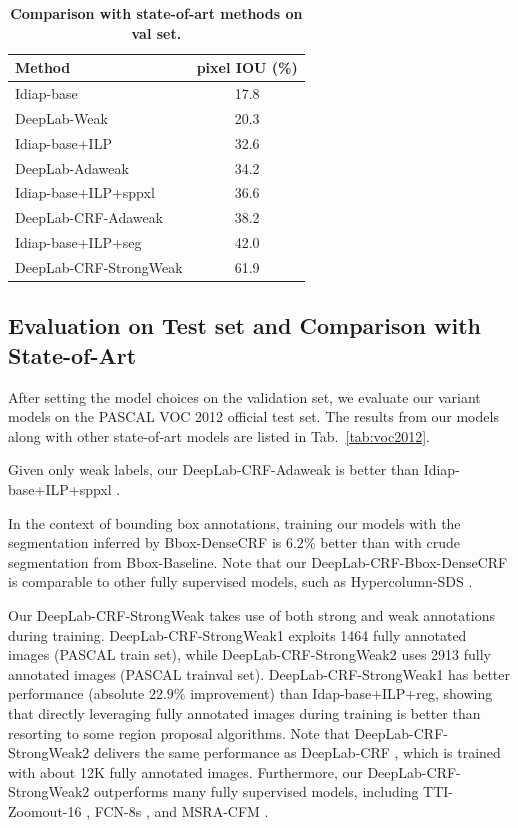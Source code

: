 \begin{table}
  \centering
  \caption{{\bf Comparison with state-of-art methods on val set.}}
  \begin{tabular}{l|c}
    {\bf Method} & pixel IOU (\%) \\
    \hline \hline
    Idiap-base   & 17.8 \\
    DeepLab-Weak & 20.3 \\
    \hline \hline
    Idiap-base+ILP  & 32.6 \\
    DeepLab-Adaweak & 34.2 \\
    \hline \hline
    Idiap-base+ILP+sppxl & 36.6 \\
    DeepLab-CRF-Adaweak  & 38.2 \\
    \hline \hline
    Idiap-base+ILP+seg       & 42.0 \\
    DeepLab-CRF-StrongWeak   & 61.9 \\
  \end{tabular}
  \label{tab:weak_state_of_art_val}
\end{table}

\subsection{Evaluation on Test set and Comparison with State-of-Art}

After setting the model choices on the validation set, we evaluate our
variant models on the PASCAL VOC 2012 official test set. The results
from our models along with other state-of-art models are listed in
Tab.~\ref{tab:voc2012}. 

Given only weak labels, our DeepLab-CRF-Adaweak is better than Idiap-base+ILP+sppxl \citep{pinheiro2014weakly}. 

In the context of bounding box annotations, training our models with the segmentation inferred by Bbox-DenseCRF is $6.2\%$ better than with crude segmentation from Bbox-Baseline. Note that our DeepLab-CRF-Bbox-DenseCRF is comparable to other fully supervised models, such as Hypercolumn-SDS \citep{hariharan2014hypercolumns}.

Our DeepLab-CRF-StrongWeak takes use of both strong and weak annotations during training. DeepLab-CRF-StrongWeak1 exploits 1464 fully annotated images (PASCAL train set), while DeepLab-CRF-StrongWeak2 uses 2913 fully annotated images (PASCAL trainval set). DeepLab-CRF-StrongWeak1 has better performance (absolute $22.9\%$ improvement) than Idap-base+ILP+reg, showing that directly leveraging fully annotated images during training is better than resorting to some region proposal algorithms. Note that DeepLab-CRF-StrongWeak2 delivers the same performance as DeepLab-CRF \citep{chen2014semantic}, which is trained with about 12K fully annotated images. Furthermore, our DeepLab-CRF-StrongWeak2 outperforms many fully supervised models, including TTI-Zoomout-16 \citep{mostajabi2014feedforward}, FCN-8s \citep{long2014fully}, and MSRA-CFM \citep{dai2014convolutional}.

